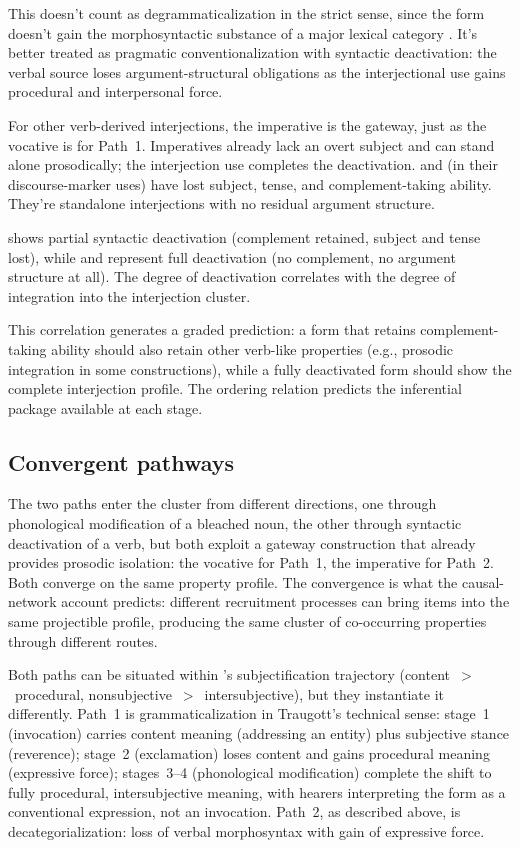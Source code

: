 \documentclass[12pt]{article}
\begin{document}
This doesn't count as degrammaticalization in the strict sense, since the
form doesn't gain the morphosyntactic substance of a major lexical category
\citep[cf.][]{norde2009}. It's better treated as pragmatic
conventionalization with syntactic deactivation: the verbal source
loses argument-structural obligations as the interjectional use gains
procedural and interpersonal force.

For other verb-derived interjections, the imperative is the gateway,
just as the vocative is for Path~1. Imperatives already lack an overt
subject and can stand alone prosodically; the interjection use completes
the deactivation.  and  (in their
discourse-marker uses) have lost subject, tense, and complement-taking
ability. They're standalone interjections
with no residual argument structure.

 shows partial syntactic
deactivation (complement retained, subject and tense lost), while
 and  represent full deactivation (no
complement, no argument structure at all). The degree of deactivation
correlates with the degree of integration into the interjection cluster.

This correlation generates a graded prediction: a form that retains
complement-taking ability should also retain other verb-like properties
(e.g., prosodic integration in some constructions), while a fully
deactivated form should show the complete interjection profile. The
ordering relation predicts the inferential package available at each
stage.

\subsection{Convergent pathways}

The two paths enter the cluster from different directions, one through
phonological modification of a bleached noun, the other through syntactic
deactivation of a verb, but both exploit a gateway construction that
already provides prosodic isolation: the vocative for Path~1, the
imperative for Path~2. Both converge on the same property profile.
The convergence is what the causal-network account predicts: different
recruitment processes can bring items into the same projectible profile,
producing the same cluster of co-occurring properties through different
routes.

Both paths can be situated within \textcite{TraugottDasher2002}'s
subjectification trajectory (content~$>$~procedural,
nonsubjective~$>$~intersubjective), but they instantiate it differently.
Path~1 is grammaticalization in Traugott's technical sense: stage~1
(invocation) carries content meaning (addressing an entity) plus
subjective stance (reverence); stage~2 (exclamation) loses content and
gains procedural meaning (expressive force); stages~3--4 (phonological
modification) complete the shift to fully procedural, intersubjective
meaning, with hearers interpreting the form as a conventional expression, not
an invocation. Path~2, as described above, is
decategorialization: loss of verbal morphosyntax with gain of expressive
force.
\end{document}
